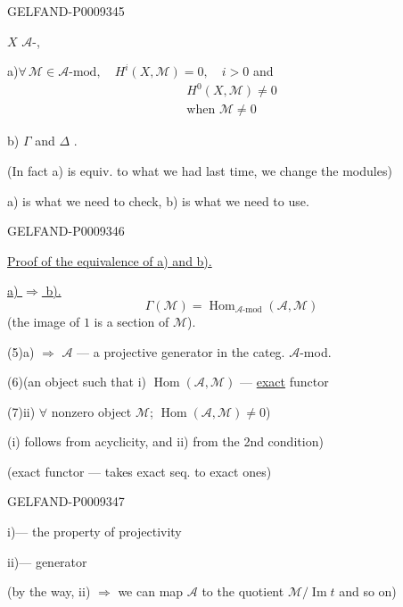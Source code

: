\begin{GelfandAdjacentEvidence}{GELFAND-P000934}{5}


 $X$  $\mathcal A$-, 

a)\enspace $\forall\,\mathcal M\in\mathcal A\text{-mod},\quad H^i(X,\mathcal M)=0,\quad i>0$ and
\[
 \begin{gathered}
 H^0(X,\mathcal M)\ne0\\[-2pt]
 \text{when }\mathcal M\ne0
 \end{gathered}
\]

b)\enspace {} $\Gamma$ and $\Delta$ .

(In fact a) is equiv. to what we had last time, we change the modules)

a) is what we need to check, b) is what we need to use.
\end{GelfandAdjacentEvidence}
\begin{GelfandAdjacentEvidence}{GELFAND-P000934}{6}


\underline{Proof of the equivalence of a) and b).}

\underline{a) $\Rightarrow$ b).}
\begin{equation*}
 \Gamma(\mathcal M)=\operatorname{Hom}_{\mathcal A\text{-mod}}(\mathcal A,\mathcal M)
 \tag{4}
\end{equation*}
(the image of $1$ is a section of $\mathcal M$).

(5)\quad a) $\Rightarrow$ $\mathcal A$ --- a projective generator in the categ. $\mathcal A$-mod.

(6)\quad (an object such that i) $\operatorname{Hom}(\mathcal A,\mathcal M)$ --- \underline{exact} functor

(7)\quad ii) $\forall$ nonzero object $\mathcal M$;\enspace
$\operatorname{Hom}(\mathcal A,\mathcal M)\ne0$)

(i) follows from acyclicity, and ii) from the 2nd condition)

(exact functor --- takes exact seq. to exact ones)
\end{GelfandAdjacentEvidence}
\begin{GelfandAdjacentEvidence}{GELFAND-P000934}{7}


i)\enspace --- the property of projectivity

ii)\enspace --- generator

(by the way, ii) $\Rightarrow$ we can map $\mathcal A$ to the quotient $\mathcal M/\operatorname{Im}t$ and so on)
\end{GelfandAdjacentEvidence}
